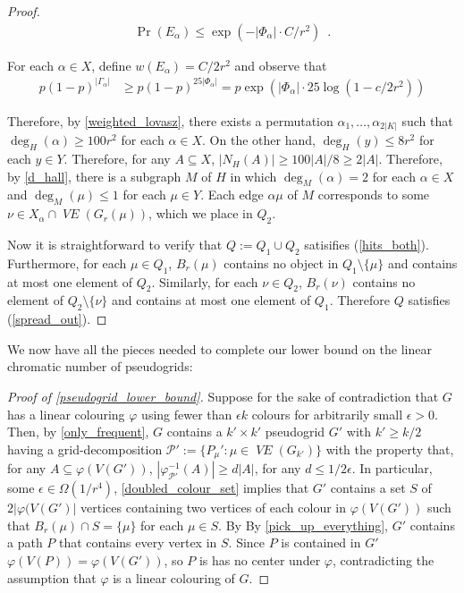 \documentclass{patmorin}
\DeclareMathOperator{\VE}{\mathit{VE}}
\begin{document}
\begin{proof}
  \begin{align*}
      \Pr(E_\alpha) \le \exp(-|\Phi_\alpha|\cdot C/r^2) \enspace .
  \end{align*}

  For each $\alpha\in X$, define $w(E_\alpha)=C/2r^2$ and observe that
  \begin{align*}
    p(1-p)^{|\Gamma_\alpha|}
    & \ge  p(1-p)^{25|\Phi_\alpha|} = p\exp(|\Phi_\alpha|\cdot 25\log(1-c/2r^2))
  \end{align*}

  Therefore, by \cref{weighted_lovasz}, there exists a permutation $\alpha_1,\ldots,\alpha_{2|K|}$ such that $\deg_H(\alpha)\ge 100r^2$ for each $\alpha\in X$.  On the other hand, $\deg_{H}(y)\le 8r^2$ for each $y\in Y$.  Therefore, for any $A\subseteq X$, $|N_H(A)|\ge 100|A|/8 \ge 2|A|$.  Therefore, by \cref{d_hall}, there is a subgraph $M$ of $H$ in which $\deg_M(\alpha)=2$ for each $\alpha\in X$ and $\deg_M(\mu)\le 1$ for each $\mu\in Y$. Each edge $\alpha\mu$ of $M$ corresponds to some $\nu\in X_\alpha\cap\VE(G_r(\mu))$, which we place in $Q_2$.

  Now it is straightforward to verify that $Q:=Q_1\cup Q_2$ satisifies (\ref{hits_both}).  Furthermore, for each $\mu\in Q_1$, $B_r(\mu)$ contains no object in $Q_1\setminus\{\mu\}$ and contains at most one element of $Q_2$.  Similarly, for each $\nu\in Q_2$, $B_r(\nu)$ contains no element of $Q_2\setminus\{\nu\}$ and contains at most one element of $Q_1$.  Therefore $Q$ satisfies (\ref{spread_out}).
\end{proof}


We now have all the pieces needed to complete our lower bound on the linear chromatic number of pseudogrids:

\begin{proof}[Proof of \cref{pseudogrid_lower_bound}]
  Suppose for the sake of contradiction that $G$ has a linear colouring $\varphi$ using fewer than $\epsilon k$ colours for arbitrarily small $\epsilon >0$.  Then, by \cref{only_frequent}, $G$ contains a $k'\times k'$ pseudogrid $G'$ with $k'\ge k/2$ having a grid-decomposition $\mathcal{P}':=\{P_\mu':\mu\in \VE(G_{k'})\}$ with the property that, for any $A\subseteq\varphi(V(G'))$, $|\varphi^{-1}_{\mathcal{P'}}(A)|\ge d|A|$, for any $d\le 1/2\epsilon$.  In particular, some $\epsilon \in \Omega(1/r^4)$, \cref{doubled_colour_set} implies that $G'$ contains a set $S$ of $2|\varphi(V(G')|$ vertices containing two vertices of each colour in $\varphi(V(G'))$ such that $B_r(\mu)\cap S = \{\mu\}$ for each $\mu\in S$.  By By \cref{pick_up_everything}, $G'$ contains a path $P$ that contains every vertex in $S$.  Since $P$ is contained in $G'$ $\varphi(V(P))=\varphi(V(G'))$, so $P$ is has no center under $\varphi$, contradicting the assumption that $\varphi$ is a linear colouring of $G$.
\end{proof}
\end{document}

